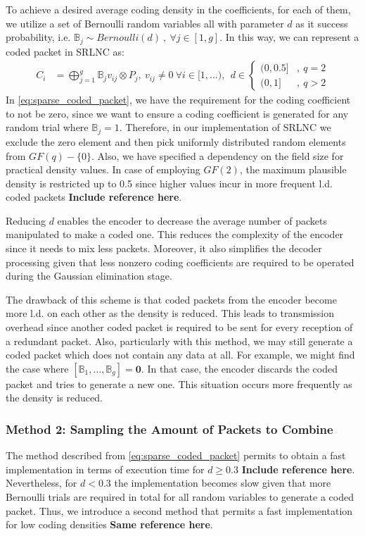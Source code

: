 To achieve a desired average coding density in the coefficients, for each
of them, we utilize a set of Bernoulli random variables all with parameter
$d$ as it success probability, i.e. $\mathbb{B}_j \sim Bernoulli(d)\ ,\ \forall
j \in [1,g]$. In this way, we can represent a coded packet in \ac{SRLNC} as:
%
\begin{align} \label{eq:sparse_coded_packet}
    C_i  &= \bigoplus_{j=1}^{g} \mathbb{B}_j v_{ij} \otimes P_j ,\ v_{ij}
    \neq 0\
    \forall i \in [1,\ldots) ,\ \
    d \in
    \begin{cases}
        {(0,0.5]} & ,\ q = 2 \\
        {(0,1]}   & ,\ q > 2
    \end{cases}
\end{align}
%
In \eqref{eq:sparse_coded_packet}, we have the requirement for the coding
coefficient to not be zero, since we want to ensure a coding coefficient
is generated for any random trial where $\mathbb{B}_j = 1$. Therefore, in our
implementation of \ac{SRLNC} we exclude the zero element and then pick
uniformly distributed random elements from $GF(q)-\{ 0 \}$. Also, we have
specified a dependency on the field size for practical
density values. In case of employing $GF(2)$, the
maximum plausible density is restricted up to 0.5 since higher values incur
in more frequent \ac{l.d.} coded packets \textbf{Include reference here}.

Reducing $d$ enables the encoder to decrease the average number of packets
manipulated to make a coded one. This reduces the complexity of the encoder
since it needs to mix less packets. Moreover, it also simplifies the decoder
processing given that less nonzero coding coefficients are required to be
operated during the Gaussian elimination stage.

The drawback of this scheme is that coded packets from the encoder
become more \ac{l.d.} on each other as the density is reduced.
This leads to transmission overhead since another coded packet
is required to be sent for every reception of a redundant packet.
Also, particularly with this method, we may still generate a coded packet
which does not contain any data at all. For example, we might find
the case where $\left[\mathbb{B}_1, \ldots, \mathbb{B}_g \right] =
\mathbf{0}$. In that case, the encoder discards the coded packet
and tries to generate a new one. This situation occurs more frequently
as the density is reduced.

\subsubsection{Method 2: Sampling the Amount of Packets to Combine}
The method described from \eqref{eq:sparse_coded_packet} permits
to obtain a fast implementation in terms of execution time for
$d \geq 0.3$ \textbf{Include reference here}. Nevertheless, for $d < 0.3$
the implementation becomes slow given that more Bernoulli trials are
required in total for all random variables to generate a coded packet.
Thus, we introduce a second method that permits a fast implementation
for low coding densities \textbf{Same reference here}.

